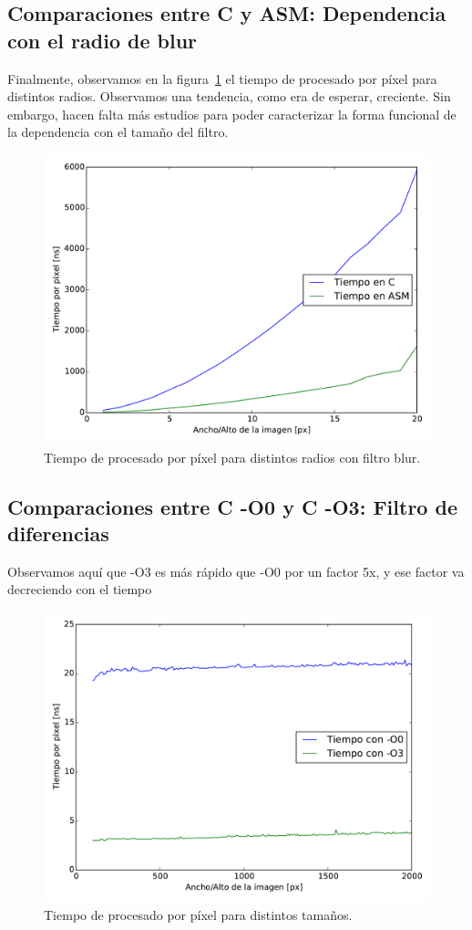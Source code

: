 \subsection{Comparaciones entre C y ASM: Dependencia con el radio de
  blur}

Finalmente, observamos en la figura~\ref{fig:tiempo_radio_blur} el tiempo
de procesado por píxel para distintos radios. Observamos una
tendencia, como era de esperar, creciente. Sin embargo, hacen falta
más estudios para poder caracterizar la forma funcional de la
dependencia con el tamaño del filtro.

\begin{figure}
  \centering
  \includegraphics[width=0.7\columnwidth]{tiempo_radio_blur.pdf}
  \caption{Tiempo de procesado por píxel para distintos radios
    con filtro blur.}
  \label{fig:tiempo_radio_blur}
\end{figure}

\subsection{Comparaciones entre C -O0 y C -O3: Filtro de diferencias}

Observamos aquí que -O3 es más rápido que -O0 por un factor 5x, y ese
factor va decreciendo con el tiempo

\begin{figure}
  \centering
  \includegraphics[width=0.7\columnwidth]{tiempo_optimiz_diff.pdf}
  \caption{Tiempo de procesado por píxel para distintos tamaños.}
  \label{fig:tiempo_optimiz_diff}
\end{figure}

